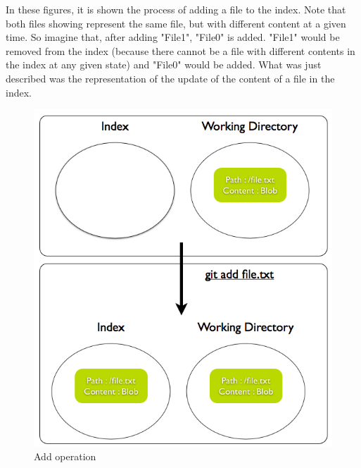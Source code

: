 In these figures, it is shown the process of adding a file to the index. Note
that both files showing represent the same file, but with different content at
a given time. So imagine that, after adding "File1", "File0" is added. "File1"
would be removed from the index (because there cannot be a file with different
contents in the index at any given state) and "File0" would be added. What was
just described was the representation of the update of the content of a file in the
index. \par
\begin{figure}[h] 
	\caption{Add operation}
	\centering
	\includegraphics[scale=0.40]{images/add1.png}
\end{figure}

